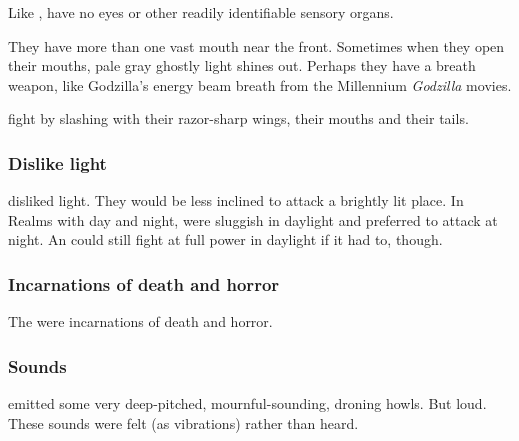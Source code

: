 Like \banes, \umbrae{} have no eyes or other readily identifiable sensory organs. 

They have more than one vast mouth near the front. 
Sometimes when they open their mouths, pale gray ghostly light shines out.
Perhaps they have a breath weapon, like Godzilla's energy beam breath from the Millennium \emph{Godzilla} movies. 

\Umbrae{} fight by slashing with their razor-sharp wings, their mouths and their tails. 






\subsubsection{Dislike light}
\Umbrae disliked light. 
They would be less inclined to attack a brightly lit place. 
In Realms with day and night, \umbrae were sluggish in daylight and preferred to attack at night. 
An \umbra could still fight at full power in daylight if it had to, though. 





\subsubsection{Incarnations of death and horror}
The \umbrae were incarnations of death and horror.





\subsubsection{Sounds}
\Umbrae{} emitted some very deep-pitched, mournful-sounding, droning howls. 
But loud. 
These sounds were felt (as vibrations) rather than heard. 









